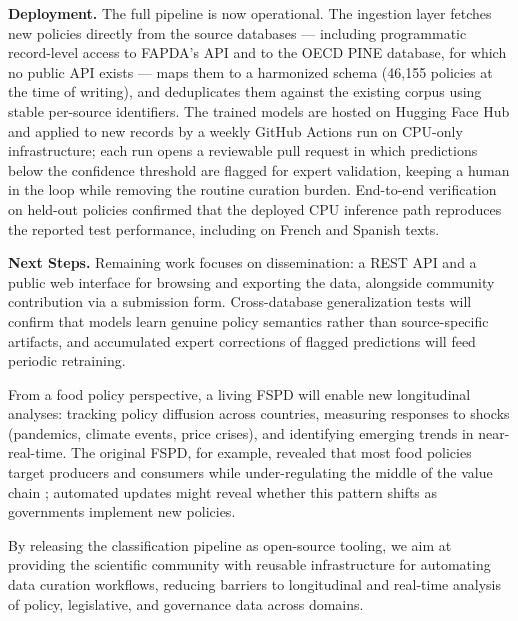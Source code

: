 \documentclass[a4paper,12pt]{article}
\begin{document}
\noindent\textbf{Deployment.} The full pipeline is now operational. The ingestion layer fetches new policies directly from the source databases — including programmatic record-level access to FAPDA's API and to the OECD PINE database, for which no public API exists — maps them to a harmonized schema (46,155 policies at the time of writing), and deduplicates them against the existing corpus using stable per-source identifiers. The trained models are hosted on Hugging Face Hub and applied to new records by a weekly GitHub Actions run on CPU-only infrastructure; each run opens a reviewable pull request in which predictions below the confidence threshold are flagged for expert validation, keeping a human in the loop while removing the routine curation burden. End-to-end verification on held-out policies confirmed that the deployed CPU inference path reproduces the reported test performance, including on French and Spanish texts.\newline

\noindent\textbf{Next Steps.} Remaining work focuses on dissemination: a REST API and a public web interface for browsing and exporting the data, alongside community contribution via a submission form. Cross-database generalization tests will confirm that models learn genuine policy semantics rather than source-specific artifacts, and accumulated expert corrections of flagged predictions will feed periodic retraining.

From a food policy perspective, a living FSPD will enable new longitudinal analyses: tracking policy diffusion across countries, measuring responses to shocks (pandemics, climate events, price crises), and identifying emerging trends in near-real-time. The original FSPD, for example, revealed that most food policies target producers and consumers while under-regulating the middle of the value chain \cite{lowder2025}; automated updates might reveal whether this pattern shifts as governments implement new policies.

By releasing the classification pipeline as open-source tooling, we aim at providing the scientific community with reusable infrastructure for automating data curation workflows, reducing barriers to longitudinal and real-time analysis of policy, legislative, and governance data across domains.


\end{document}

